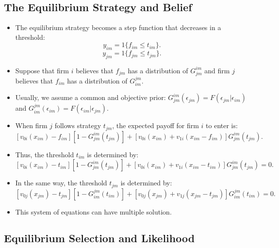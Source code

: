\documentclass[]{book}
\providecommand{\tightlist}{%
  \setlength{\itemsep}{0pt}\setlength{\parskip}{0pt}}
\begin{document}
\subsection{The Equilibrium Strategy and
Belief}\label{the-equilibrium-strategy-and-belief}

\begin{itemize}
\tightlist
\item
  The equilibrium strategy becomes a step function that decreases in a
  threshold: \[
  y_{im} = 1\{f_{im} \le t_{im}\}.
  \] \[
  y_{jm} = 1\{f_{jm} \le t_{jm}\}.
  \]
\item
  Suppose that firm \(i\) believes that \(f_{jm}\) has a distribution of
  \(G_{jm}^{im}\) and firm \(j\) believes that \(f_{im}\) has a
  distribution of \(G_{im}^{jm}\).
\item
  Usually, we assume a common and objective prior:
  \(G_{jm}^{im}(\epsilon_{jm}) = F(\epsilon_{jm}|\epsilon_{im})\) and
  \(G_{im}^{jm}(\epsilon_{im}) = F(\epsilon_{im}|\epsilon_{jm})\).
\item
  When firm \(j\) follows strategy \(t_{jm}\), the expected payoff for
  firm \(i\) to enter is: \[
  [v_{0i}(x_{im}) - f_{im}][1 - G_{jm}^{im}(t_{jm})] + [v_{0i}(x_{im}) + v_{1i}(x_{im} - f_{im})] G_{jm}^{im}(t_{jm}).
  \]
\item
  Thus, the threshold \(t_{im}\) is determined by: \[
  [v_{0i}(x_{im}) - t_{im}][1 - G_{jm}^{im}(t_{jm})] + [v_{0i}(x_{im}) + v_{1i}(x_{im} - t_{im})] G_{jm}^{im}(t_{jm}) = 0.
  \]
\item
  In the same way, the threshold \(t_{jm}\) is determined by: \[
  [v_{0j}(x_{jm}) - t_{jm}][1 - G_{im}^{jm}(t_{im})] + [v_{0j}(x_{jm}) + v_{1j}(x_{jm} - t_{jm})] G_{im}^{jm}(t_{im}) = 0.
  \]
\item
  This system of equations can have multiple solution.
\end{itemize}

\subsection{Equilibrium Selection and
Likelihood}\label{equilibrium-selection-and-likelihood}
\end{document}
